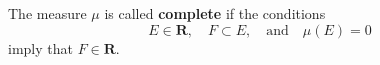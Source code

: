 The measure $\mu$ is called \textbf{complete} if the conditions
$$E \in \mathbf{R}, \quad F \subset E, \quad \text{and} \quad \mu(E) = 0$$
imply that $F \in \mathbf{R}$.
